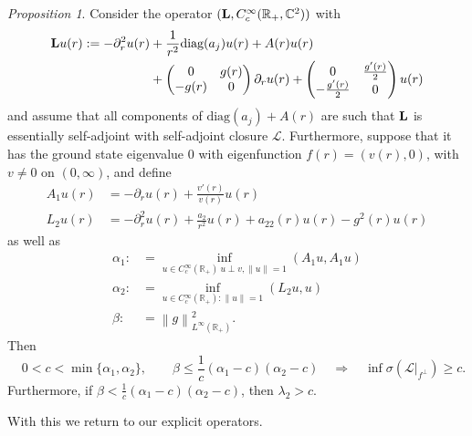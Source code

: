 \documentclass[11pt,reqno]{amsart}
\theoremstyle{remark}
\newtheorem{prop}{Proposition}[section]
\newcommand{\R}{\mathbb{R}}
\newcommand{\Lf}{\textup{\textbf{L}}}
\newcommand{\C}{\mathbb{C}}
\theoremstyle{definition}
\begin{document}
\begin{prop}\label{prop:abstract spectral prop}
Consider the operator $(\Lf, C^\infty_c(\R_+,\C^2))$ with 
\begin{align*} \Lf u(r):=
    -\partial_r^2 u(r) &+\frac{1}{r^2}\text{diag} (a_j) u(r)+A(r)u(r) \\
    &+ \begin{pmatrix}
        0 & g(r)
        \\
        -g(r) &0
    \end{pmatrix}\partial_r u(r)
+
    \begin{pmatrix}
        0 & \frac{g'(r)}{2}
        \\
        -\frac{g'(r)}{2} &0
    \end{pmatrix} u(r)
\end{align*}
and assume that all components of $\text{diag} (a_j)+A(r)$ are such that $\Lf$ is essentially self-adjoint with self-adjoint closure $\mathcal{L}$.
 Furthermore, suppose that it has the ground state eigenvalue $0$ with eigenfunction $f(r)=(v(r),0)$, with $v\neq 0$ on $(0,\infty)$, and define 
\begin{align*}
    A_1 u(r)&= -\partial_r u(r)+\frac{v'(r)}{v(r)}u(r)
    \\
    L_2u(r)&=- \partial_r^2 u(r)+\frac{a_2}{r^2}u(r)+a_{22}(r) u(r)-g^2(r) u(r)
\end{align*}
as well as
\begin{align*}
    \alpha_1:&=\inf_{u\in C{^\infty_c}(\R_+)\: u\perp v, \|u\|=1} (A_1u,A_1 u)
    \\
      \alpha_2:&=\inf_{u\in C{^\infty_c}(\R_+):\|u\|=1} (L_2u,u)
      \\
      \beta:&= \left\| g\right\|_{L^\infty(\R_+)}^2.
\end{align*}
Then 
\[
\quad
0<c<\min\{\alpha_1,\alpha_2\},\qquad
\beta\leq \frac1c(\alpha_1-c)(\alpha_2-c)
\quad\Longrightarrow\quad
\inf\sigma\!\left(\mathcal L\big|_{f^\perp}\right)\ge c.
\]
Furthermore, if $\beta < \frac1c(\alpha_1-c)(\alpha_2-c)$, then $\lambda_2>c $.
\end{prop}
With this we return to our explicit operators.
\end{document}
